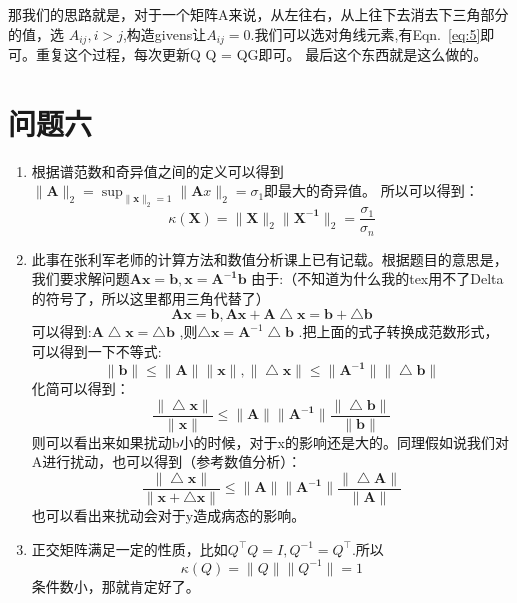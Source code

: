 \documentclass[answers]{exam}  %
\begin{document}
\begin{enumerate}[label=\alph*.]
    那我们的思路就是，对于一个矩阵A来说，从左往右，从上往下去消去下三角部分的值，选
    $A_{ij},i>j$,构造givens让$A_{ij}=0$.我们可以选对角线元素,有Eqn.~\ref{eq:5}即可。重复这个过程，每次更新Q
    Q = QG即可。
    最后这个东西就是这么做的。

\end{enumerate}

\section{问题六}
\begin{enumerate}[label=\alph*.] 
    \item 根据谱范数和奇异值之间的定义可以得到$\|\mathbf{A}\|_2 = \sup_{\|\mathbf{x}\|_2 = 1} \|\mathbf{A}x\|_2 = \sigma_1$即最大的奇异值。
    所以可以得到：
    \begin{equation*}
        \kappa(\mathbf{X}) =  \|\mathbf{X}\|_2 \|\mathbf{X^{-1}}\|_2 = \frac{\sigma_1}{\sigma_n}
    \end{equation*}
    \item 此事在张利军老师的计算方法和数值分析课上已有记载。根据题目的意思是，我们要求解问题$\mathbf{Ax} = \mathbf{b},\mathbf{x} = \mathbf{A^{-1}b}$
    由于:（不知道为什么我的tex用不了Delta的符号了，所以这里都用三角代替了）
    \begin{equation*}
        \mathbf{Ax} = \mathbf{b}, \mathbf{Ax+ A \bigtriangleup x} = \mathbf{b+ \bigtriangleup b}
    \end{equation*}
    可以得到:$\mathbf{A}\bigtriangleup \mathbf{x} = \bigtriangleup\mathbf{b}$
    ,则$\bigtriangleup  \mathbf{x}  = \mathbf{A}^{-1}\bigtriangleup\mathbf{b}$
    .把上面的式子转换成范数形式，可以得到一下不等式:
    \begin{equation*}
        \|\mathbf{b}\| \leq \|\mathbf{A}\| \|\mathbf{x}\|, \|\bigtriangleup\mathbf{x} \| \leq \|\mathbf{A^{-1}}\| \|\bigtriangleup\mathbf{b} \| 
    \end{equation*}
    化简可以得到：
    \begin{equation*}
        \frac{ \|\bigtriangleup\mathbf{x} \| }{ \|\mathbf{x} \| } \leq  \|\mathbf{A} \|  \|\mathbf{A^{-1}} \| \frac{ \|\bigtriangleup\mathbf{b} \| }{ \|\mathbf{b} \| } 
    \end{equation*}
    则可以看出来如果扰动b小的时候，对于x的影响还是大的。同理假如说我们对A进行扰动，也可以得到（参考数值分析）：
    \begin{equation*}
        \frac{ \|\bigtriangleup\mathbf{x} \| }{ \|\mathbf{x}+\bigtriangleup\mathbf{x}\| } \leq  \|\mathbf{A} \|  \|\mathbf{A^{-1}} \| \frac{ \|\bigtriangleup\mathbf{A} \| }{ \|\mathbf{A} \| } 
    \end{equation*}
    也可以看出来扰动会对于y造成病态的影响。
    \item 正交矩阵满足一定的性质，比如$Q^\top Q = I,Q^{-1} = Q^\top$.所以
    \begin{equation*}
        \kappa(Q) = \|Q\| \|Q^{-1}\| = 1
    \end{equation*}
    条件数小，那就肯定好了。
\end{enumerate}
\end{document}
